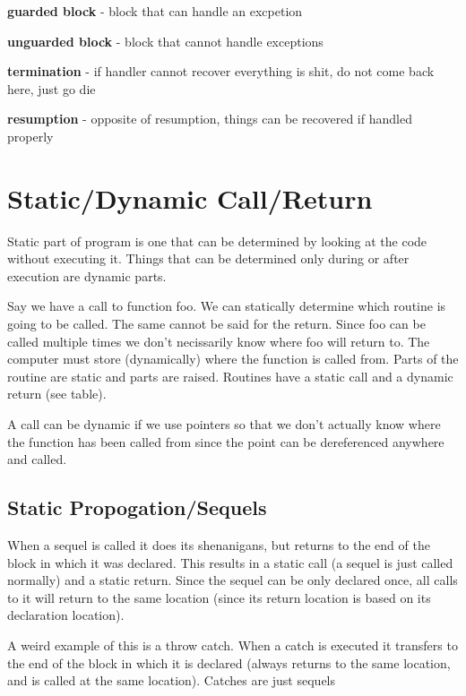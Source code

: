 \documentclass{article}
\begin{document}
\textbf{guarded block} - block that can handle an excpetion

\textbf{unguarded block} - block that cannot handle exceptions

\textbf{termination} - if handler cannot recover everything is shit, do not come back here, just go die

\textbf{resumption} - opposite of resumption, things can be recovered if handled properly

\section{Static/Dynamic Call/Return}
Static part of program is one that can be determined by looking at the code without executing it. Things that can be determined only during or after execution are dynamic parts.

Say we have a call to function foo. We can statically determine which routine is going to be called. The same cannot be said for the return. Since foo can be called multiple times we don't necissarily know where foo will return to. The computer must store (dynamically) where the function is called from. Parts of the routine are static and parts are raised. Routines have a static call and a dynamic return (see table).

A call can be dynamic if we use pointers so that we don't actually know where the function has been called from since the point can be dereferenced anywhere and called.

\subsection{Static Propogation/Sequels}
When a sequel is called it does its shenanigans, but returns to the end of the block in which it was declared. This results in a static call (a sequel is just called normally) and a static return. Since the sequel can be only declared once, all calls to it will return to the same location (since its return location is based on its declaration location).

A weird example of this is a throw catch. When a catch is executed it transfers to the end of the block in which it is declared (always returns to the same location, and is called at the same location). Catches are just sequels
\end{document}
